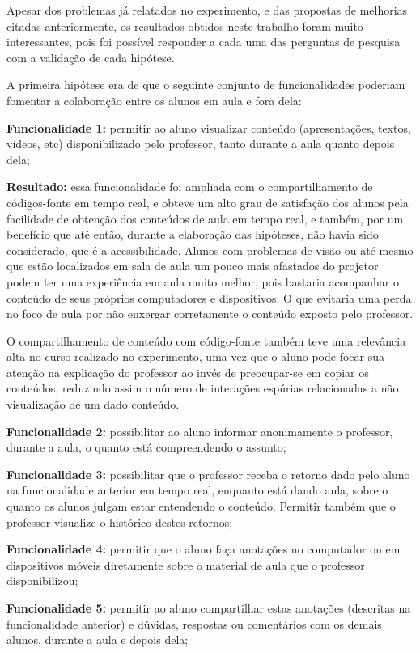 Apesar dos problemas já relatados no experimento, e das propostas de melhorias citadas anteriormente, os resultados obtidos neste trabalho foram muito interessantes, pois foi possível responder a cada uma das perguntas de pesquisa com a validação de cada hipótese.

A primeira hipótese era de que o seguinte conjunto de funcionalidades poderiam fomentar a colaboração entre os alunos em aula e fora dela:

\textbf{Funcionalidade 1:} permitir ao aluno visualizar conteúdo (apresentações, textos, vídeos, etc) disponibilizado pelo professor, tanto durante a aula quanto depois dela;

\textbf{Resultado:} essa funcionalidade foi ampliada com o compartilhamento de códigos-fonte em tempo real, e obteve um alto grau de satisfação dos alunos pela facilidade de obtenção dos conteúdos de aula em tempo real, e também, por um benefício que até então, durante a elaboração das hipóteses, não havia sido considerado, que é a acessibilidade. Alunos com problemas de visão ou até mesmo que estão localizados em sala de aula um pouco mais afastados do projetor podem ter uma experiência em aula muito melhor, pois bastaria acompanhar o conteúdo de seus próprios computadores e dispositivos. O que evitaria uma perda no foco de aula por não enxergar corretamente o conteúdo exposto pelo professor. 

O compartilhamento de conteúdo com código-fonte também teve uma relevância alta no curso realizado no experimento, uma vez que o aluno pode focar sua atenção na explicação do professor ao invés de preocupar-se em copiar os conteúdos, reduzindo assim o número de interações espúrias relacionadas a não visualização de um dado conteúdo.

\textbf{Funcionalidade 2:} possibilitar ao aluno informar anonimamente o professor, durante a aula, o quanto está compreendendo o assunto;

\textbf{Funcionalidade 3:} possibilitar que o professor receba o retorno dado pelo aluno na funcionalidade anterior em tempo real, enquanto está dando aula, sobre o quanto os alunos julgam estar entendendo o conteúdo. Permitir também que o professor visualize o histórico destes retornos;

\textbf{Funcionalidade 4:} permitir que o aluno faça anotações no computador ou em dispositivos móveis diretamente sobre o material de aula que o professor disponibilizou;

\textbf{Funcionalidade 5:} permitir ao aluno compartilhar estas anotações (descritas na funcionalidade anterior) e dúvidas, respostas ou comentários com os demais alunos, durante a aula e depois dela;


